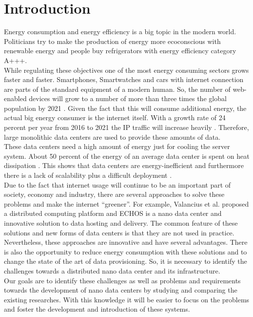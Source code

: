 \documentclass[sigchi-a, authorversion]{acmart}
\begin{document}
\section{Introduction} %
Energy consumption and energy efficiency is a big topic in the modern world. Politicians try to make the production of energy more ecoconscious with renewable energy and people buy refrigerators with energy efficiency category A+++. \\
While regulating these objectives one of the most energy consuming sectors grows faster and faster. Smartphones, Smartwatches and cars with internet connection are parts of the standard equipment of a modern human. So, the number of web-enabled devices will grow to a number of more than three times the global population by 2021 \cite{TheZetta68:online}. Given the fact that this will consume additional energy, the actual big energy consumer is the internet itself. With a growth rate of 24 percent per year from 2016 to 2021 the IP traffic will increase heavily \cite{TheZetta68:online}. Therefore, large monolithic data centers are used to provide these amounts of data. \\
These data centers need a high amount of energy just for cooling the server system. About 50 percent of the energy of an average data center is spent on heat dissipation \cite{DBLP:conf/conext/ValanciusLMDR09}. This shows that data centers are energy-inefficient and furthermore there is a lack of scalability plus a difficult deployment \cite{DBLP:conf/conext/ValanciusLMDR09}. \\
Due to the fact that internet usage will continue to be an important part of society, economy and industry, there are several approaches to solve these problems and make the internet ``greener''. For example, Valancius et al. \cite{DBLP:conf/conext/ValanciusLMDR09} proposed a distributed computing platform and ECHOS \cite{Laoutaris:2008:EEC:1341431.1341442} is a nano data center and innovative solution to data hosting and delivery. The common feature of these solutions and new forms of data centers is that they are not used in practice. \\
Nevertheless, these approaches are innovative and have several advantages. There is also the opportunity to reduce energy consumption with these solutions and to change the state of the art of data provisioning. So, it is necessary to identify the challenges towards a distributed nano data center and its infrastructure. \\
Our goals are to identify these challenges as well as problems and requirements towards the development of nano data centers by studying and comparing the existing researches. With this knowledge it will be easier to focus on the problems and foster the development and introduction of these systems. \\
\end{document}
